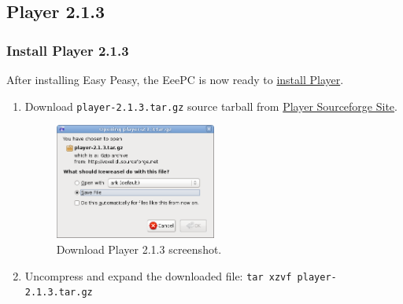 \subsection{Player 2.1.3}
\label{sec:player213}

\subsubsection{Install Player 2.1.3}
After installing Easy Peasy, the EeePC is now ready to \href{http://playerstage.sourceforge.net/doc/Player-2.1.0/player/install.html}{install Player}.

\begin{enumerate}
\item Download \texttt{player-2.1.3.tar.gz} source tarball from \href{http://sourceforge.net/projects/playerstage/files/}{Player Sourceforge Site}.

\begin{figure}[!h]
\centering
\includegraphics[width=0.5\textwidth]{figures/2_opening_player.png}
\caption{Download Player 2.1.3 screenshot.}
\label{fig:open_player}
\end{figure}

\item Uncompress and expand the downloaded file: \texttt{tar xzvf player-2.1.3.tar.gz}


\end{enumerate}
